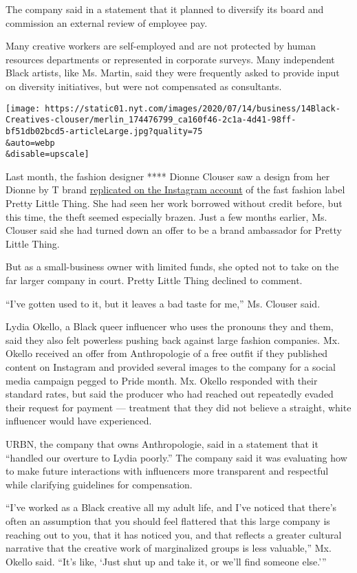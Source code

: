 The company said in a statement that it planned to diversify its board
and commission an external review of employee pay.

Many creative workers are self-employed and are not protected by human
resources departments or represented in corporate surveys. Many
independent Black artists, like Ms. Martin, said they were frequently
asked to provide input on diversity initiatives, but were not
compensated as consultants.

\texttt{[image: https://static01.nyt.com/images/2020/07/14/business/14Black-Creatives-clouser/merlin\_174476799\_ca160f46-2c1a-4d41-98ff-bf51db02bcd5-articleLarge.jpg?quality=75\\\&auto=webp\\\&disable=upscale]}

Last month, the fashion designer **** Dionne Clouser saw a design from
her Dionne by T brand
\href{https://twitter.com/_tdionne/status/1275836655027384320?s=20}{replicated
on the Instagram account} of the fast fashion label Pretty Little Thing.
She had seen her work borrowed without credit before, but this time, the
theft seemed especially brazen. Just a few months earlier, Ms. Clouser
said she had turned down an offer to be a brand ambassador for Pretty
Little Thing.

But as a small-business owner with limited funds, she opted not to take
on the far larger company in court. Pretty Little Thing declined to
comment.

``I've gotten used to it, but it leaves a bad taste for me,'' Ms.
Clouser said.

Lydia Okello, a Black queer influencer who uses the pronouns they and
them, said they also felt powerless pushing back against large fashion
companies. Mx. Okello received an offer from Anthropologie of a free
outfit if they published content on Instagram and provided several
images to the company for a social media campaign pegged to Pride month.
Mx. Okello responded with their standard rates, but said the producer
who had reached out repeatedly evaded their request for payment ---
treatment that they did not believe a straight, white influencer would
have experienced.

URBN, the company that owns Anthropologie, said in a statement that it
``handled our overture to Lydia poorly.'' The company said it was
evaluating how to make future interactions with influencers more
transparent and respectful while clarifying guidelines for compensation.

``I've worked as a Black creative all my adult life, and I've noticed
that there's often an assumption that you should feel flattered that
this large company is reaching out to you, that it has noticed you, and
that reflects a greater cultural narrative that the creative work of
marginalized groups is less valuable,'' Mx. Okello said. ``It's like,
`Just shut up and take it, or we'll find someone else.'''

